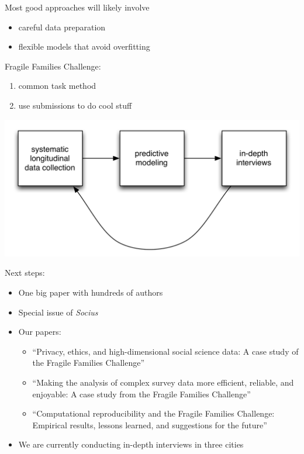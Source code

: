 \documentclass{beamer}
\begin{document}
\begin{frame}

Most good approaches will likely involve \pause
\begin{itemize}
\item careful data preparation
\pause
\item flexible models that avoid overfitting
\end{itemize}

\end{frame}
\begin{frame}

Fragile Families Challenge:
\begin{enumerate}
\item common task method
\pause
\item use submissions to do cool stuff
\end{enumerate}

\end{frame}
\begin{frame}

\begin{center}
\includegraphics[width=\textwidth]{figures/kaizen_cycle}
\end{center}

\end{frame}
\begin{frame}

Next steps:
\begin{itemize}
\item One big paper with hundreds of authors \pause
\item Special issue of \textit{Socius} \pause
\item Our papers: \pause
\begin{itemize}
\item ``Privacy, ethics, and high-dimensional social science data: A case study of the Fragile Families Challenge'' \pause
\item ``Making the analysis of complex survey data more efficient, reliable, and enjoyable: A case study from the Fragile Families Challenge'' \pause
\item ``Computational reproducibility and the Fragile Families Challenge: Empirical results, lessons learned, and suggestions for the future'' \pause
\end{itemize}
\item We are currently conducting in-depth interviews in three cities
\end{itemize}

\end{frame}
\end{document}
